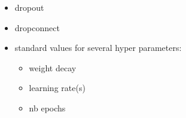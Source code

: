 \begin{itemize}
 \item dropout
 \item dropconnect
 \item standard values for several hyper parameters:
 \begin{itemize}
  \item weight decay
  \item learning rate(s)
  \item nb epochs
 \end{itemize}

\end{itemize}
